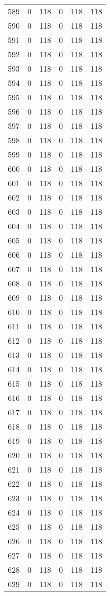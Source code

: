 \documentclass[a4paper]{ctexart}
\begin{document}
\begin{longtable}{p{1cm}|p{2cm}|p{2cm}|p{2cm}|P{2cm}|p{2cm}}
		589&0&118&0&118&118\\
		590&0&118&0&118&118\\
		591&0&118&0&118&118\\
		592&0&118&0&118&118\\
		593&0&118&0&118&118\\
		594&0&118&0&118&118\\
		595&0&118&0&118&118\\
		596&0&118&0&118&118\\
		597&0&118&0&118&118\\
		598&0&118&0&118&118\\
		599&0&118&0&118&118\\
		600&0&118&0&118&118\\
		601&0&118&0&118&118\\
		602&0&118&0&118&118\\
		603&0&118&0&118&118\\
		604&0&118&0&118&118\\
		605&0&118&0&118&118\\
		606&0&118&0&118&118\\
		607&0&118&0&118&118\\
		608&0&118&0&118&118\\
		609&0&118&0&118&118\\
		610&0&118&0&118&118\\
		611&0&118&0&118&118\\
		612&0&118&0&118&118\\
		613&0&118&0&118&118\\
		614&0&118&0&118&118\\
		615&0&118&0&118&118\\
		616&0&118&0&118&118\\
		617&0&118&0&118&118\\
		618&0&118&0&118&118\\
		619&0&118&0&118&118\\
		620&0&118&0&118&118\\
		621&0&118&0&118&118\\
		622&0&118&0&118&118\\
		623&0&118&0&118&118\\
		624&0&118&0&118&118\\
		625&0&118&0&118&118\\
		626&0&118&0&118&118\\
		627&0&118&0&118&118\\
		628&0&118&0&118&118\\
		629&0&118&0&118&118\\

\end{longtable}
\end{document}
